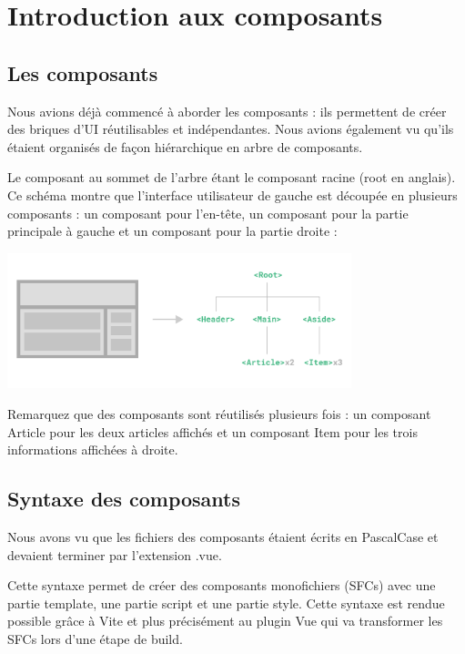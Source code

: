 \section{Introduction aux composants}
\subsection{Les composants}
Nous avions déjà commencé à aborder les composants : ils permettent de créer des briques d'{\color{monOrange}UI} réutilisables et indépendantes. Nous avions également vu qu'ils étaient organisés de façon hiérarchique en arbre de composants.

Le composant au sommet de l'arbre étant le composant racine ({\color{monOrange}root} en anglais). Ce schéma montre que l'interface utilisateur de gauche est découpée en plusieurs composants : un composant pour l'en-tête, un composant pour la partie principale à gauche et un composant pour la partie droite :

\begin{center}
\includegraphics[width=10cm]{images/image08.png}
\end{center}

Remarquez que des composants sont réutilisés plusieurs fois : un composant {\color{monOrange}Article} pour les deux articles affichés et un composant {\color{monOrange}Item} pour les trois informations affichées à droite.

\subsection{Syntaxe des composants}
Nous avons vu que les fichiers des composants étaient écrits en {\color{monOrange}PascalCase} et devaient terminer par l'extension {\color{monOrange}.vue}.

Cette syntaxe permet de créer des composants monofichiers ({\color{monOrange}SFCs}) avec une partie {\color{monOrange}template}, une partie script et une partie style. Cette syntaxe est rendue possible grâce à {\color{monOrange}Vite} et plus précisément au {\color{monOrange}plugin Vue} qui va transformer les {\color{monOrange}SFCs} lors d'une étape de {\color{monOrange}build}.


